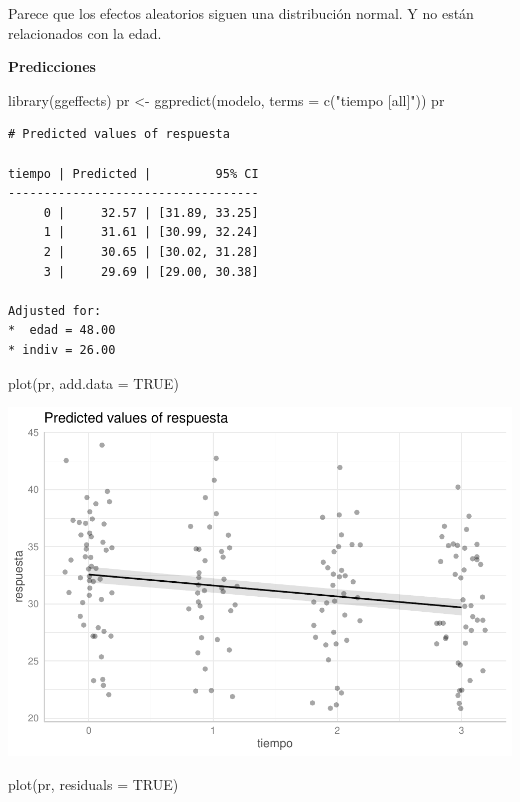 \documentclass[
]{book}
\newenvironment{Shaded}{\begin{snugshade}}{\end{snugshade}}
\newcommand{\AttributeTok}[1]{\textcolor[rgb]{0.77,0.63,0.00}{#1}}
\newcommand{\ConstantTok}[1]{\textcolor[rgb]{0.00,0.00,0.00}{#1}}
\newcommand{\FunctionTok}[1]{\textcolor[rgb]{0.00,0.00,0.00}{#1}}
\newcommand{\NormalTok}[1]{#1}
\newcommand{\OtherTok}[1]{\textcolor[rgb]{0.56,0.35,0.01}{#1}}
\newcommand{\StringTok}[1]{\textcolor[rgb]{0.31,0.60,0.02}{#1}}
\begin{document}
Parece que los efectos aleatorios siguen una distribución normal. Y no están relacionados con la edad.

\textbf{Predicciones}

\begin{Shaded}
\begin{Highlighting}[]
\FunctionTok{library}\NormalTok{(ggeffects)}
\NormalTok{pr }\OtherTok{\textless{}{-}} \FunctionTok{ggpredict}\NormalTok{(modelo, }\AttributeTok{terms =} \FunctionTok{c}\NormalTok{(}\StringTok{"tiempo [all]"}\NormalTok{))}
\NormalTok{pr}
\end{Highlighting}
\end{Shaded}

\begin{verbatim}
# Predicted values of respuesta

tiempo | Predicted |         95% CI
-----------------------------------
     0 |     32.57 | [31.89, 33.25]
     1 |     31.61 | [30.99, 32.24]
     2 |     30.65 | [30.02, 31.28]
     3 |     29.69 | [29.00, 30.38]

Adjusted for:
*  edad = 48.00
* indiv = 26.00
\end{verbatim}

\begin{Shaded}
\begin{Highlighting}[]
\FunctionTok{plot}\NormalTok{(pr, }\AttributeTok{add.data =} \ConstantTok{TRUE}\NormalTok{)}
\end{Highlighting}
\end{Shaded}

\includegraphics{fig_out/unnamed-chunk-131-1.pdf}

\begin{Shaded}
\begin{Highlighting}[]
\FunctionTok{plot}\NormalTok{(pr, }\AttributeTok{residuals =} \ConstantTok{TRUE}\NormalTok{)}
\end{Highlighting}
\end{Shaded}
\end{document}
